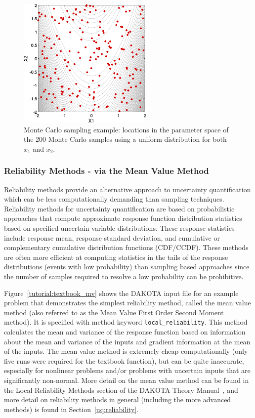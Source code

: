 \begin{figure}[ht!]
  \centering
  \includegraphics[height=2.5in]{images/rosen_nond_pts}
  \caption{Monte Carlo sampling example: locations in the parameter
    space of the 200 Monte Carlo samples using a uniform distribution
    for both $x_1$ and $x_2$.}
  \label{tutorial:rosenbrock_mc_points}
\end{figure}


\subsubsection{Reliability Methods - via the Mean Value Method}\label{tutorial:example:uncert_quant:reliability}

Reliability methods provide an alternative approach to uncertainty
quantification which can be less computationally demanding than
sampling techniques.  Reliability methods for uncertainty
quantification are based on probabilistic approaches that compute
approximate response function distribution statistics based on
specified uncertain variable distributions.  These response statistics
include response mean, response standard deviation, and cumulative or
complementary cumulative distribution functions (CDF/CCDF).  These
methods are often more efficient at computing statistics in the tails
of the response distributions (events with low probability) than
sampling based approaches since the number of samples required to
resolve a low probability can be prohibitive.

Figure~\ref{tutorial:textbook_mv} shows the DAKOTA input file for an
example problem that demonstrates the simplest reliability method,
called the mean value method (also referred to as the Mean Value First
Order Second Moment method).  It is specified with method keyword
\texttt{local\_reliability}.  This method calculates the mean and
variance of the response function based on information about the mean
and variance of the inputs and gradient information at the mean of the
inputs. The mean value method is extremely cheap computationally (only
five runs were required for the textbook function), but can be quite
inaccurate, especially for nonlinear problems and/or problems with
uncertain inputs that are significantly non-normal. More detail on the
mean value method can be found in the Local Reliability Methods
section of the DAKOTA Theory Manual~\cite{TheoMan}, and more detail on
reliability methods in general (including the more advanced methods)
is found in Section~\ref{uq:reliability}.

